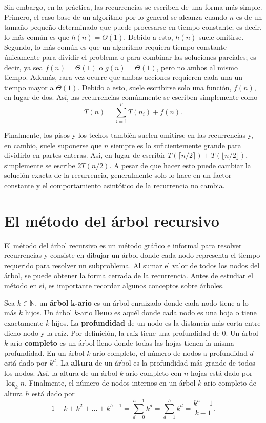 Sin embargo, en la práctica, las recurrencias se escriben de una forma más simple.
Primero, el caso base de un algoritmo por lo general se alcanza cuando \(n\) es de un tamaño pequeño determinado que puede procesarse en tiempo constante; es decir, lo más común es que \(h(n)=\Theta(1)\).
Debido a esto, \(h(n)\) suele omitirse.
Segundo, lo más común es que un algoritmo requiera tiempo constante únicamente para dividir el problema o para combinar las soluciones parciales; es decir, ya sea \(f(n)=\Theta(1)\) o \(g(n)=\Theta(1)\), pero no ambos al mismo tiempo.
Además, rara vez ocurre que ambas acciones requieren cada una un tiempo mayor a \(\Theta(1)\).
Debido a esto, suele escribirse solo una función, \(f(n)\), en lugar de dos.
Así, las recurrencias comúnmente se escriben simplemente como
\[
  T(n)=\sum_{i=1}^pT(n_i)+f(n).
\]

Finalmente, los pisos y los techos también suelen omitirse en las recurrencias y, en cambio, suele suponerse que \(n\) siempre es lo suficientemente grande para dividirlo en partes enteras.
Así, en lugar de escribir \(T(\lceil n/2 \rceil)+T(\lfloor n/2 \rfloor)\), simplemente se escribe \(2T(n/2)\).
A pesar de que hacer esto puede cambiar la solución exacta de la recurrencia, generalmente solo lo hace en un factor constante y el comportamiento asintótico de la recurrencia no cambia.

\section{El método del árbol recursivo}

El método del árbol recursivo es un método gráfico e informal para resolver recurrencias y consiste en dibujar un árbol donde cada nodo representa el tiempo requerido para resolver un subproblema.
Al sumar el valor de todos los nodos del árbol, se puede obtener la forma cerrada de la recurrencia. 
Antes de estudiar el método en sí, es importante recordar algunos conceptos sobre árboles.

Sea \(k\in\mathbb{N}\), un \textbf{árbol} \(\boldsymbol{k}\)\textbf{-ario} es un árbol enraizado donde cada nodo tiene a lo más \(k\) hijos. 
Un árbol \(k\)-ario \textbf{lleno} es aquél donde cada nodo es una hoja o tiene exactamente \(k\) hijos. 
La \textbf{profundidad} de un nodo es la distancia más corta entre dicho nodo 
y la raíz. 
Por definición, la raíz tiene una profundidad de 0.
Un árbol \(k\)-ario \textbf{completo} es un árbol lleno donde todas las hojas tienen la misma profundidad.
En un árbol \(k\)-ario completo, el número de nodos a profundidad \(d\) está dado por \(k^d\).
La \textbf{altura} de un árbol es la profundidad más grande de todos los nodos.
Así, la altura de un árbol \(k\)-ario completo con \(n\) hojas está dado por \(\log_k{n}\).
Finalmente, el número de nodos internos en un árbol \(k\)-ario completo de altura \(h\) está dado por
\[
  1+k+k^2+\dots+k^{h-1} = 
  \sum_{d=0}^{h-1}k^d =
  \sum_{d=1}^{h}k^d =
  \dfrac{k^h-1}{k-1}.
\]


